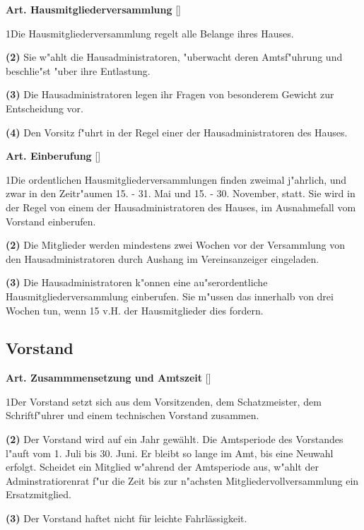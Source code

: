\documentclass[12pt]{article}
\newcommand{\UAbschnitt}[1]{\subsection{#1}}
\newcommand{\Satz}[2]{

\begin{samepage}
{\bf (#1)} #2
\end{samepage}
}
\newenvironment{Artikel}[2]{
\bigskip \centerline{{\bf Art. #1} [#2]}
\nopagebreak
}{
}
\begin{document}
\begin{Artikel}{20}{Hausmitgliederversammlung}

\Satz{1}{Die Hausmitgliederversammlung regelt alle Belange ihres Hauses.}

\Satz{2}{Sie w"ahlt die Hausadministratoren, "uberwacht deren 
Amtsf"uhrung und beschlie"st "uber ihre Entlastung.}

\Satz{3}{Die Hausadministratoren legen ihr Fragen von besonderem Gewicht
zur Entscheidung vor.}

\Satz{4}{Den Vorsitz f"uhrt in der Regel einer der Hausadministratoren
des Hauses.}

\end{Artikel}

\begin{Artikel}{21}{Einberufung}

\Satz{1}{Die ordentlichen Hausmitgliederversammlungen finden zweimal 
j"ahrlich, und zwar in den Zeit\-r"aumen 15. - 31. Mai und 15. - 30. November, 
statt. Sie wird in der Regel von einem der Hausadministratoren des Hauses, im
Ausnahmefall vom Vorstand einberufen.}

\Satz{2}{Die Mitglieder werden mindestens zwei Wochen vor der Versammlung 
von den Hausadministratoren durch Aushang im Vereinsanzeiger eingeladen.}

\Satz{3}{Die Hausadministratoren k"onnen eine au"serordentliche 
Hausmitgliederversammlung einberufen. Sie m"ussen das innerhalb von drei 
Wochen tun, wenn 15 v.H. der Hausmitglieder dies fordern.}

\end{Artikel}

\UAbschnitt{Vorstand}

\begin{Artikel}{22}{Zusammmensetzung und Amtszeit}

\Satz{1}{Der Vorstand setzt sich aus dem Vorsitzenden, dem Schatzmeister, dem
Schriftf"uhrer und einem technischen Vorstand zusammen.}

\Satz{2}{Der Vorstand wird auf ein Jahr gewählt. Die Amtsperiode des
Vorstandes l"auft vom 1. Juli bis 30. Juni. Er bleibt so lange im Amt, bis eine
Neuwahl erfolgt. Scheidet ein Mitglied w"ahrend der Amtsperiode aus, w"ahlt der
Adminstratiorenrat f"ur die Zeit bis zur n"achsten Mitgliedervollversammlung
ein Ersatzmitglied.}

\Satz{3}{Der Vorstand haftet nicht für leichte Fahrlässigkeit.}

\end{Artikel}
\end{document}
